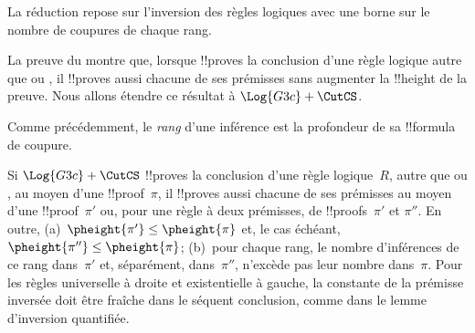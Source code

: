 \documentclass[../../../include/open-logic-section]{subfiles}
\begin{document}


La réduction repose sur l'inversion des règles logiques avec
une borne sur le nombre de coupures de chaque rang.












La preuve du  montre que, lorsque
 !!{prove}s la conclusion d'une règle logique autre que
\RightR{\lexists} ou \LeftR{\lforall}, il !!{prove}s aussi
chacune de ses prémisses sans augmenter la !!{height} de la preuve.
Nous allons étendre ce résultat à $\Log{G3c}+\CutCS$.

Comme précédemment, le \emph{rang} d'une inférence \CutCS est
la profondeur de sa !!{formula} de coupure.

\begin{lem}
Si $\Log{G3c}+\CutCS$ !!{prove}s la conclusion d'une règle
logique~$R$, autre que \RightR{\lexists} ou \LeftR{\lforall},
au moyen d'une !!{proof}~$\pi$, il !!{prove}s aussi chacune de
ses prémisses au moyen d'une !!{proof}~$\pi'$ ou, pour une règle
à deux prémisses, de !!{proof}s~$\pi'$ et $\pi''$.
En outre,
(a)~$\pheight{\pi'}\le\pheight{\pi}$ et, le cas échéant,
$\pheight{\pi''}\le\pheight{\pi}$;
(b)~pour chaque rang, le nombre d'inférences \CutCS de ce rang
dans~$\pi'$ et, séparément, dans~$\pi''$, n'excède pas leur nombre
dans~$\pi$.
Pour les règles universelle à droite et existentielle à gauche,
la constante de la prémisse inversée doit être fraîche dans
le séquent conclusion, comme dans le lemme d'inversion quantifiée.
\end{lem}
\end{document}
